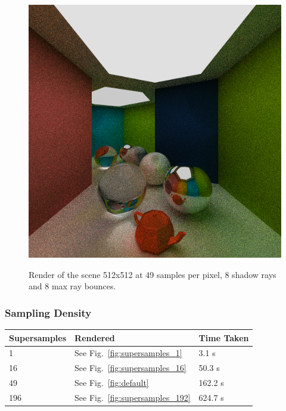 \documentclass[a4paper, twocolumn]{article}
\begin{document}
                        \begin{figure}[H]
                \centering
                \caption{Render of the scene 512x512 at 49 samples per pixel, 8 shadow rays and 8 max ray bounces.}
                \includegraphics[width=0.8\linewidth]{share/results/bounce_rays_8.png}
                \label{fig:bounces_8}
            \end{figure}

            \subsubsection*{Sampling Density}

            \begin{table}[H]
            \centering
            \begin{tabular}{lll}
                \toprule
                \textbf{Supersamples}&\textbf{Rendered}&\textbf{Time Taken}\\
                \midrule
                1&See Fig.~\ref{fig:supersamples_1}&3.1 s\\
                16&See Fig.~\ref{fig:supersamples_16}&50.3 s\\
                49&See Fig.~\ref{fig:default}&162.2 s\\
                196&See Fig.~\ref{fig:supersamples_192}&624.7 s\\
                \bottomrule
            \end{tabular}
            \label{tab:shadow_rays}
            \end{table}
\end{document}
